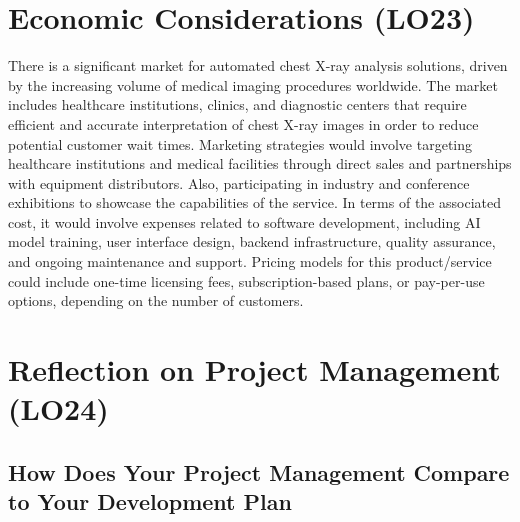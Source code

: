 \documentclass{article}
\begin{document}
\section{Economic Considerations (LO23)}


There is a significant market for automated chest X-ray analysis solutions, driven by the increasing volume of medical imaging procedures worldwide. The market includes healthcare institutions, clinics, and diagnostic centers that require efficient and accurate interpretation of chest X-ray images in order to reduce potential customer wait times. Marketing strategies would involve targeting healthcare institutions and medical facilities through direct sales and partnerships with equipment distributors. Also, participating in industry and conference exhibitions to showcase the capabilities of the service. In terms of the associated cost, it would involve expenses related to software development, including AI model training, user interface design, backend infrastructure, quality assurance, and ongoing maintenance and support. Pricing models for this product/service could include one-time licensing fees, subscription-based plans, or pay-per-use options, depending on the number of customers.  

\section{Reflection on Project Management (LO24)}

\subsection{How Does Your Project Management Compare to Your Development Plan}
\end{document}
